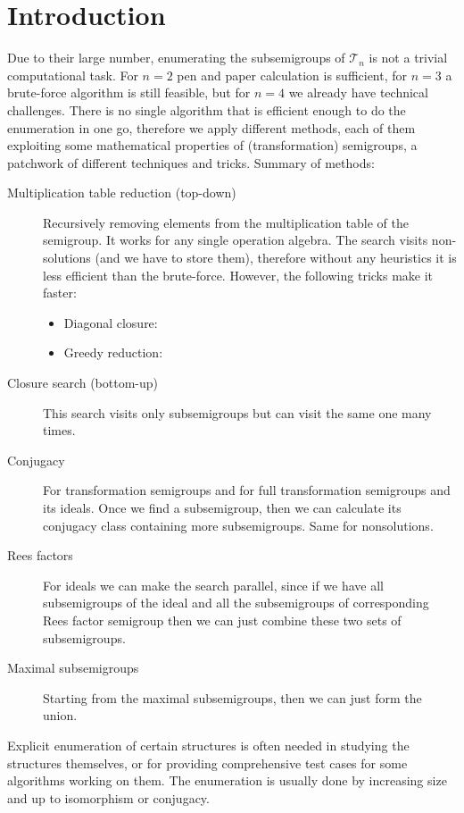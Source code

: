 \documentclass{amsart}
\newcommand{\cT}{{\mathcal T}}
\theoremstyle{plain}
\theoremstyle{definition}
\begin{document}
\section{Introduction}
Due to their large number, enumerating the subsemigroups of $\cT_n$ is not a trivial computational task.
For $n=2$ pen and paper calculation is sufficient, for $n=3$ a brute-force algorithm is still feasible, but for $n=4$ we already have technical challenges.
There is no single algorithm that is efficient enough to do the enumeration in one go, therefore we apply different methods, each of them exploiting some mathematical properties of (transformation) semigroups, a patchwork of different techniques and tricks. 
Summary of methods:
\begin{description}
\item[Multiplication table reduction (top-down)] Recursively removing elements from the multiplication table of the semigroup.
It works for any single operation algebra.
The search visits non-solutions (and we have to store them), therefore without any heuristics it is less efficient than the brute-force. However, the following tricks make it faster:
\begin{itemize}
\item Diagonal closure:
\item Greedy reduction:
\end{itemize}
\item[Closure search (bottom-up)] This search visits only subsemigroups but can visit the same one many times.
\item[Conjugacy] For transformation semigroups and for full transformation semigroups and its ideals. Once we find a subsemigroup, then we can calculate its conjugacy class containing more subsemigroups. Same for nonsolutions.
\item[Rees factors] For ideals we can make the search parallel, since if we have all subsemigroups of the ideal and all the subsemigroups of corresponding Rees factor semigroup then we can just combine these two sets of subsemigroups. 
\item[Maximal subsemigroups] Starting from the maximal subsemigroups, then we can just form the union.
\end{description}



Explicit enumeration of certain structures is often needed in studying the structures themselves, or for providing comprehensive test cases for some algorithms working on them.
The enumeration is usually done by increasing size and up to isomorphism or conjugacy. 
\end{document}
